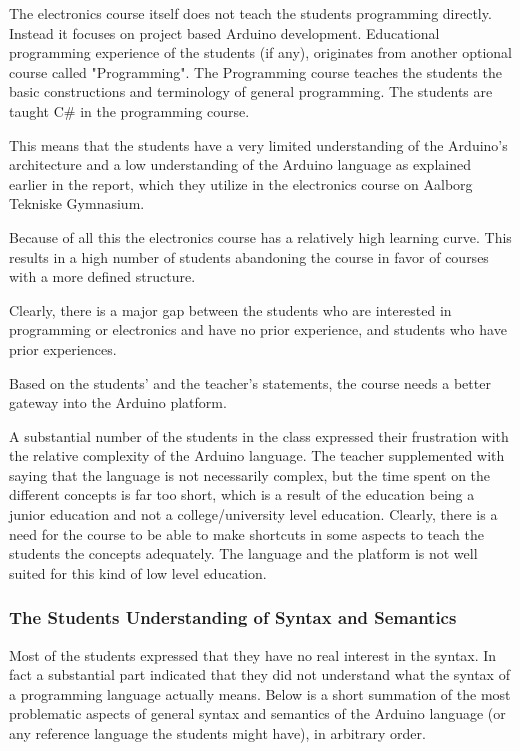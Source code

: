 The electronics course itself does not teach the students programming directly. 
Instead it focuses on project based Arduino development. 
Educational programming experience of the students (if any), originates from another optional course called "Programming". 
The Programming course teaches the students the basic constructions and terminology of general programming. 
The students are taught C{\#} in the programming course. 

This means that the students have a very limited understanding of the Arduino's architecture and a low understanding of the Arduino language as explained earlier in the report, which they utilize in the electronics course on Aalborg Tekniske Gymnasium.

Because of all this the electronics course has a relatively high learning curve. 
This results in a high number of students abandoning the course in favor of courses with a more defined structure.

Clearly, there is a major gap between the students who are interested in programming or electronics and have no prior experience, and students who have prior experiences. 

Based on the students' and the teacher's statements, the course needs a better gateway into the Arduino platform.

A substantial number of the students in the class expressed their frustration with the relative complexity of the Arduino language. 
The teacher supplemented with saying that the language is not necessarily complex, but the time spent on the different concepts is far too short, which is a result of the education being a junior education and not a college/university level education.
Clearly, there is a need for the course to be able to make shortcuts in some aspects to teach the students the concepts adequately. 
The language and the platform is not well suited for this kind of low level education.

\subsubsection{The Students Understanding of Syntax and Semantics}
Most of the students expressed that they have no real interest in the syntax. 
In fact a substantial part indicated that they did not understand what the syntax of a programming language actually means. 
Below is a short summation of the most problematic aspects of general syntax and semantics of the Arduino language (or any reference language the students might have), in arbitrary order.


